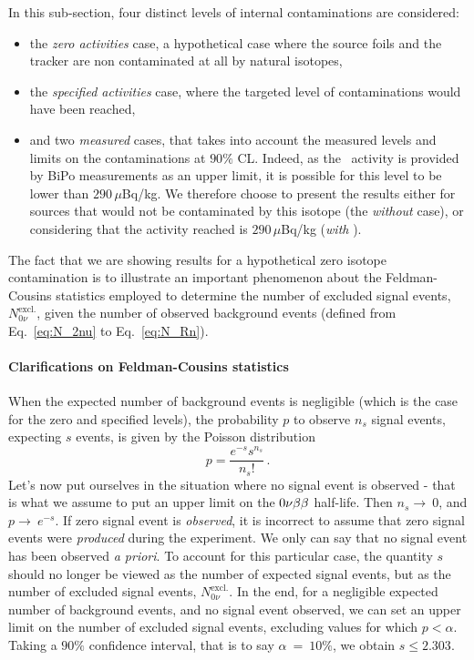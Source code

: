 In this sub-section, four distinct levels of internal contaminations are considered:
\begin{itemize}
\item the \emph{zero activities} case, a hypothetical case where the source foils and the tracker are non contaminated at all by natural isotopes,
\item the \emph{specified activities} case, where the targeted level of contaminations would have been reached,
\item and two \emph{measured} cases,  that takes into account the measured levels and limits on the contaminations at $90\%$ CL.
  Indeed, as the \Bi\ activity is provided by BiPo measurements as an upper limit, it is possible for this level to be lower than $290\,\mu$Bq/kg.
  We therefore choose to present the results either for sources that would not be contaminated by this isotope (the \emph{without \Bi} case), or considering that the activity reached is $290\,\mu$Bq/kg (\emph{with \Bi}).
\end{itemize}
The fact that we are showing results for a hypothetical zero isotope contamination is to illustrate an important phenomenon about the Feldman-Cousins statistics employed to determine the number of excluded signal events, $N_{0\nu}^{\text{excl.}}$, given the number of observed background events (defined from Eq.~\eqref{eq:N_2nu} to Eq.~\eqref{eq:N_Rn}).

\paragraph{Clarifications on Feldman-Cousins statistics}
When the expected number of background events is negligible (which is the case for the zero and specified levels), the probability $p$ to observe $n_{s}$ signal events, expecting $s$ events, is given by the Poisson distribution
\begin{equation}
p = \frac{e^{-s}s^{n_{s}}}{n_{s}!}\,.
\end{equation}
Let's now put ourselves in the situation where no signal event is observed - that is what we assume to put an upper limit on the $0\nu\beta\beta$ half-life.
Then $n_{s}\rightarrow~0$, and $p\rightarrow~e^{-s}$.
If zero signal event is \emph{observed}, it is incorrect to assume that zero signal events were \emph{produced} during the experiment.
We only can say that no signal event has been observed \emph{a priori}.
To account for this particular case, the quantity $s$ should no longer be viewed as the number of expected signal events, but as the number of excluded signal events, $N_{0\nu}^{\text{excl.}}$.
In the end, for a negligible expected number of background events, and no signal event observed, we can set an upper limit on the number of excluded signal events, excluding values for which $p < \alpha$.
Taking a $90\%$ confidence interval, that is to say $\alpha~=~10\%$, we obtain $s \leq 2.303$.

